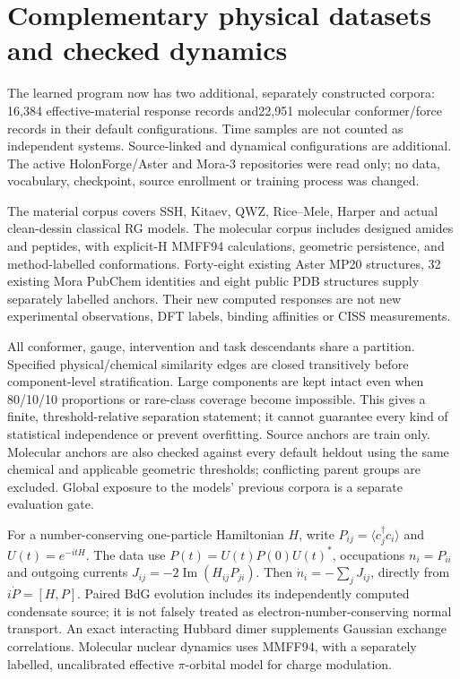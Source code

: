\documentclass[11pt,oneside,openany]{book}
\theoremstyle{definition}\newtheorem{definition}[theorem]{Definition}
\theoremstyle{remark}\newtheorem{remark}[theorem]{Remark}
\begin{document}
\section{Complementary physical datasets and checked dynamics}
The learned program now has two additional, separately constructed corpora:
16,384 effective-material response records and22,951 molecular conformer/force
records in their default configurations. Time samples are not counted as
independent systems. Source-linked and dynamical configurations are additional.
The active HolonForge/Aster and Mora-3 repositories were read only; no data,
vocabulary, checkpoint, source enrollment or training process was changed.

The material corpus covers SSH, Kitaev, QWZ, Rice--Mele, Harper and actual
clean-dessin classical RG models. The molecular corpus includes designed
amides and peptides, with explicit-H MMFF94 calculations, geometric persistence,
and method-labelled conformations. Forty-eight existing Aster MP20 structures,
32 existing Mora PubChem identities and eight public PDB structures supply
separately labelled anchors. Their new computed responses are not new
experimental observations, DFT labels, binding affinities or CISS measurements.

All conformer, gauge, intervention and task descendants share a partition.
Specified physical/chemical similarity edges are closed transitively before
component-level stratification. Large components are kept intact even when
80/10/10 proportions or rare-class coverage become impossible. This gives a
finite, threshold-relative separation statement; it cannot guarantee every
kind of statistical independence or prevent overfitting. Source anchors are
train only. Molecular anchors are also checked against every default heldout
using the same chemical and applicable geometric thresholds; conflicting parent
groups are excluded. Global exposure to the models' previous corpora is a separate
evaluation gate.

For a number-conserving one-particle Hamiltonian $H$, write
$P_{ij}=\langle c_j^\dagger c_i\rangle$ and $U(t)=e^{-itH}$.
The data use $P(t)=U(t)P(0)U(t)^*$, occupations $n_i=P_{ii}$ and
outgoing currents $J_{ij}=-2\operatorname{Im}(H_{ij}P_{ji})$.
Then $\dot n_i=-\sum_jJ_{ij}$, directly from $i\dot P=[H,P]$.
Paired BdG evolution includes its independently computed condensate source;
it is not falsely treated as electron-number-conserving normal transport.
An exact interacting Hubbard dimer supplements Gaussian exchange correlations.
Molecular nuclear dynamics uses MMFF94, with a separately labelled,
uncalibrated effective $\pi$-orbital model for charge modulation.
\end{document}
